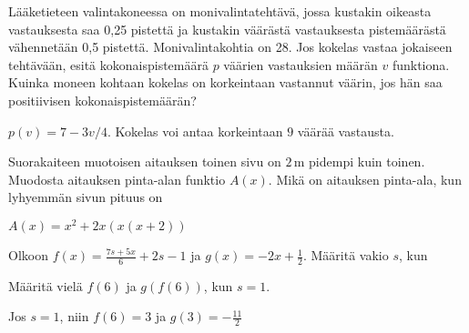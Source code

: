 \begin{tehtavasivu}
\begin{tehtava}
	Lääketieteen valintakoneessa on monivalintatehtävä, jossa kustakin oikeasta vastauksesta 	saa 0,25 pistettä ja kustakin väärästä vastauksesta pistemäärästä vähennetään 0,5				pistettä. Monivalintakohtia on 28. Jos kokelas vastaa jokaiseen tehtävään, esitä 				kokonaispistemäärä $p$ väärien vastauksien määrän $v$ funktiona. Kuinka moneen kohtaan 			kokelas on korkeintaan vastannut väärin, jos hän saa positiivisen kokonaispistemäärän?
	\begin{vastaus}
		$p(v) = 7-3v/4$. Kokelas voi antaa korkeintaan $9$ väärää vastausta.
	\end{vastaus}
	
\end{tehtava}


\begin{tehtava}
  Suorakaiteen muotoisen aitauksen toinen sivu on $2$\,m pidempi kuin toinen. Muodosta aitauksen pinta-alan funktio $A(x)$. Mikä on aitauksen pinta-ala, kun lyhyemmän sivun pituus on
  \begin{alakohdat}
  \end{alakohdat}

  \begin{vastaus}
    $A(x) = x^2 + 2x(x(x+2))$ %
      \begin{alakohdat}
      \end{alakohdat}
  \end{vastaus}
\end{tehtava}

\begin{tehtava}
  Olkoon $f(x) = \frac{7s + 5x}{6} + 2s - 1$ ja $g(x) = -2x + \frac{1}{2}$. Määritä vakio $s$, kun
  \begin{alakohdat}
   \end{alakohdat}
   Määritä vielä $f(6)$ ja $g(f(6))$, kun $s=1$. 
  \begin{vastaus}
      \begin{alakohdat}
      \end{alakohdat}
   Jos $s=1$, niin $f(6) = 3$ ja $g(3) = -\frac{11}{2}$
  \end{vastaus}
\end{tehtava}


\end{tehtavasivu}
